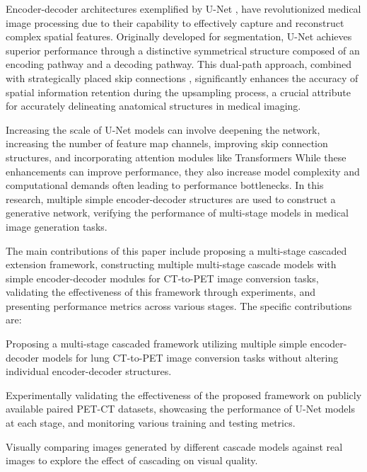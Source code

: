 \documentclass[a4paper, times, 10pt,twocolumn]{article}
\begin{document}
Encoder-decoder architectures exemplified by U-Net \cite{navab_u-net_2015}, have revolutionized medical image processing due to their capability to effectively capture and reconstruct complex spatial features. Originally developed for segmentation, U-Net achieves superior performance through a distinctive symmetrical structure composed of an encoding pathway and a decoding pathway. This dual-path approach, combined with strategically placed skip connections \cite{he_deep_2016}, significantly enhances the accuracy of spatial information retention during the upsampling process, a crucial attribute for accurately delineating anatomical structures in medical imaging.

Increasing the scale of U-Net models can involve deepening the network, increasing the number of feature map channels, improving skip connection structures, and incorporating attention modules like Transformers 
While these enhancements can improve performance, they also increase model complexity and computational demands 
 often leading to performance bottlenecks. In this research, multiple simple encoder-decoder structures are used to construct a generative network, verifying the performance of multi-stage models in medical image generation tasks.

The main contributions of this paper include proposing a multi-stage cascaded extension framework, constructing multiple multi-stage cascade models with simple encoder-decoder modules for CT-to-PET image conversion tasks, validating the effectiveness of this framework through experiments, and presenting performance metrics across various stages. The specific contributions are:

Proposing a multi-stage cascaded framework utilizing multiple simple encoder-decoder models for lung CT-to-PET image conversion tasks without altering individual encoder-decoder structures.

Experimentally validating the effectiveness of the proposed framework on publicly available paired PET-CT datasets, showcasing the performance of U-Net models at each stage, and monitoring various training and testing metrics.

Visually comparing images generated by different cascade models against real images to explore the effect of cascading on visual quality.

\end{document}
